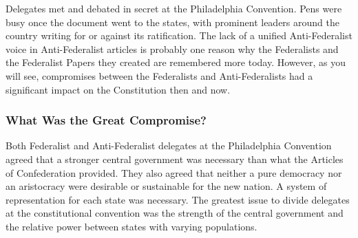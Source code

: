 Delegates met and debated in secret at the Philadelphia Convention. Pens were
busy once the document went to the states, with prominent leaders around the
country writing for or against its ratification. The lack of a unified
Anti-Federalist voice in Anti-Federalist articles is probably one reason why the
Federalists and the Federalist Papers they created are remembered more today.
However, as you will see, compromises between the Federalists and
Anti-Federalists had a significant impact on the Constitution then and now.

\subsubsection*{What Was the Great Compromise?}

Both Federalist and Anti-Federalist delegates at the Philadelphia Convention
agreed that a stronger central government was necessary than what the Articles
of Confederation provided. They also agreed that neither a pure democracy nor an
aristocracy were desirable or sustainable for the new nation. A system of
representation for each state was necessary. The greatest issue to divide
delegates at the constitutional convention was the strength of the central
government and the relative power between states with varying populations.

